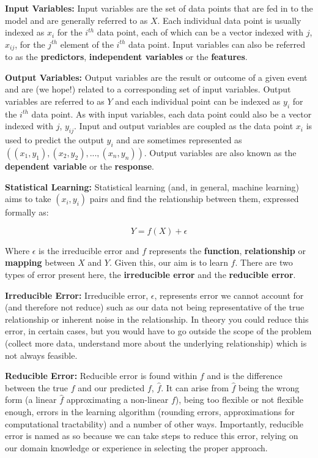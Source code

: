 \textbf{Input Variables:} Input variables are the set of data points that are fed in to the model and are generally referred to as $X$. Each individual data point is usually indexed as $x_{i}$ for the $i^{th}$ data point, each of which can be a vector indexed with $j$, $x_{ij}$, for the $j^{th}$ element of the $i^{th}$ data point. Input variables can also be referred to as the \textbf{predictors}, \textbf{independent variables} or the \textbf{features}.

\textbf{Output Variables:} Output variables are the result or outcome of a given event and are (we hope!) related to a corresponding set of input variables. Output variables are referred to as $Y$ and each individual point can be indexed as $y_{i}$ for the $i^{th}$ data point. As with input variables, each data point could also be a vector indexed with $j$, $y_{ij}$. Input and output variables are coupled as the data point $x_{i}$ is used to predict the output $y_{i}$ and are sometimes represented as $((x_{1},y_{1}), (x_{2},y_{2}),...,(x_{n},y_{n}))$. Output variables are also known as the \textbf{dependent variable} or the \textbf{response}. 

\textbf{Statistical Learning:} Statistical learning (and, in general, machine learning) aims to take $(x_{i},y_{i})$ pairs and find the relationship between them, expressed formally as:

$$ Y = f(X) + \epsilon $$

Where $\epsilon$ is the irreducible error and $f$ represents the \textbf{function}, \textbf{relationship} or \textbf{mapping} between $X$ and $Y$. Given this, our aim is to learn $f$. There are two types of error present here, the \textbf{irreducible error} and the \textbf{reducible error}.

\textbf{Irreducible Error:} Irreducible error, $\epsilon$, represents error we cannot account for (and therefore not reduce) such as our data not being representative of the true relationship or inherent noise in the relationship. In theory you could reduce this error, in certain cases, but you would have to go outside the scope of the problem (collect more data, understand more about the underlying relationship) which is not always feasible.

\textbf{Reducible Error:} Reducible error is found within $f$ and is the difference between the true $f$ and our predicted $f$, $\hat{f}$. It can arise from $\hat{f}$ being the wrong form (a linear $\hat{f}$ approximating a non-linear $f$), being too flexible or not flexible enough, errors in the learning algorithm (rounding errors, approximations for computational tractability) and a number of other ways. Importantly, reducible error is named as so because we can take steps to reduce this error, relying on our domain knowledge or experience in selecting the proper approach.

